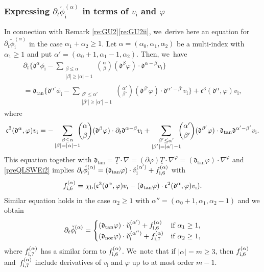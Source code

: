 \documentclass[10pt]{amsart}
\newcommand{\dtan}{{\mathfrak d}_\mathrm{tan}}
\newcommand{\dnor}{{\mathfrak d}_\mathrm{nor}}
\newcommand{\dt}{\partial_t}
\newcommand{\ul}[1]{\underline{#1}}
\theoremstyle{definition}
\begin{document}
\subsubsection{Expressing $\dt \check{\phi}_\mathrm{i}^{(\alpha)}$ in terms of $v_\mathrm{i}$ and $\varphi$}\label{sectexprdtphi}
In connection with Remark \ref{re:GU2}\eqref{re:GU2ii}, we~derive here an equation for $\dt\check{\phi}_\mathrm{i}^{(\alpha)}$ in the case $\alpha_1+\alpha_2\geq1$.
Let $\alpha=(\alpha_0,\alpha_1,\alpha_2)$ be a multi-index with $\alpha_1\geq1$ and put $\alpha'=(\alpha_0+1,\alpha_1-1,\alpha_2)$.
Then, we~have
\begin{multline*}
 \dt\biggl\{ \mathfrak{d}^{\alpha}\phi_\mathrm{i}
- \sum_{\substack{\beta\leq\alpha\\ |\beta|\geq|\alpha|-1}} \binom{\alpha}{\beta} (\mathfrak{d}^{\beta}\varphi)\cdot\mathfrak{d}^{\alpha-\beta}v_\mathrm{i} \biggr\} \\[-8pt]
= \dtan\biggl\{ \mathfrak{d}^{\alpha'}\phi_\mathrm{i}
- \sum_{\substack{\beta'\leq\alpha'\\ |\beta'|\geq|\alpha'|-1}} \binom{\alpha'}{\beta'} (\mathfrak{d}^{\beta'}\varphi)\cdot\mathfrak{d}^{\alpha'-\beta'}v_\mathrm{i} \biggr\}
+ {\mathfrak c}^3(\mathfrak{d}^\alpha,\varphi)v_\mathrm{i},
\end{multline*}
where
\[
{\mathfrak c}^3(\mathfrak{d}^\alpha,\varphi)v_\mathrm{i}
= - \sum_{\substack{\beta\leq\alpha\\ |\beta|=|\alpha|-1}}\hspace*{-2mm} \binom{\alpha}{\beta}(\mathfrak{d}^\beta\varphi)\cdot\dt\mathfrak{d}^{\alpha-\beta}v_\mathrm{i}
+ \sum_{\substack{\beta'\leq\alpha'\\ |\beta'|=|\alpha'|-1}} \hspace*{-2mm}\binom{\alpha'}{\beta'} (\mathfrak{d}^{\beta'}\varphi)\cdot\dtan\mathfrak{d}^{\alpha'-\beta'}v_\mathrm{i}.
\]
This equation together with $\dtan=\ul{T}\cdot\nabla=(\partial\varphi)\ul{T}\cdot\nabla^\varphi=(\dtan\varphi)\cdot\nabla^\varphi$ and \eqref{preQLSWEi2} implies
$\dt\check{\phi}_\mathrm{i}^{(\alpha)} = (\dtan\varphi)\cdot\check{v}_\mathrm{i}^{(\alpha')} + f_{{\rm i},6}^{(\alpha)}$ with
\[
f_{{\rm i},6}^{(\alpha)}
= \chi_\mathrm{b}({\mathfrak c}^3(\mathfrak{d}^\alpha,\varphi)v_\mathrm{i} - (\dtan\varphi)\cdot {\mathfrak c}^2(\mathfrak{d}^\alpha,\varphi)v_\mathrm{i}).
\]
Similar equation holds in the case $\alpha_2\geq1$ with $\alpha''=(\alpha_0+1,\alpha_1,\alpha_2-1)$ and we obtain
\begin{equation}\label{Dtphii}
\dt\check{\phi}_\mathrm{i}^{(\alpha)} =
\begin{cases}
(\dtan\varphi)\cdot\check{v}_\mathrm{i}^{(\alpha')} + f_{{\rm i},6}^{(\alpha)} &\mbox{if } \alpha_1\geq1, \\
(\dnor\varphi)\cdot\check{v}_\mathrm{i}^{(\alpha'')} + f_{{\rm i},7}^{(\alpha)} &\mbox{if } \alpha_2\geq1,
\end{cases}
\end{equation}
where $f_{{\rm i},7}^{(\alpha)}$ has a similar form to $f_{{\rm i},6}^{(\alpha)}$. We~note that if $|\alpha|=m\geq3$, then $f_{{\rm i},6}^{(\alpha)}$ and~$f_{{\rm i},7}^{(\alpha)}$ include derivatives of $v_\mathrm{i}$ and $\varphi$
up to at most order $m-1$.
\end{document}
